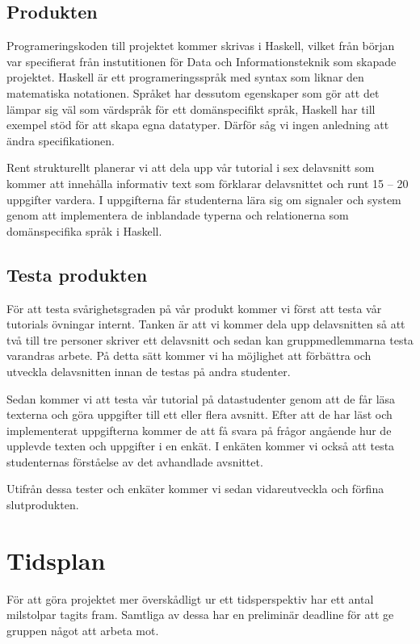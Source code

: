 \documentclass{article}
\begin{document}
\subsection{Produkten}
Programeringskoden till projektet kommer skrivas i Haskell,
vilket från början var specifierat från instutitionen för
Data och Informationsteknik som skapade projektet.
Haskell är ett programeringsspråk med syntax som liknar den
matematiska notationen. Språket har dessutom egenskaper
som gör att det lämpar sig väl som värdspråk för ett domänspecifikt språk,
Haskell har till exempel stöd för att skapa egna datatyper.
Därför såg vi ingen anledning att ändra specifikationen.

Rent strukturellt planerar vi att dela upp vår tutorial i
sex delavsnitt som kommer att innehålla informativ text som
förklarar delavsnittet och runt 15 -- 20 uppgifter vardera.
I uppgifterna får studenterna lära sig om signaler och
system genom att implementera de inblandade typerna
och relationerna som domänspecifika språk i Haskell.

\subsection{Testa produkten}
För att testa svårighetsgraden på vår produkt kommer vi
först att testa vår tutorials övningar internt. Tanken är att
vi kommer dela upp delavsnitten så att två till tre personer
skriver ett delavsnitt och sedan kan gruppmedlemmarna testa
varandras arbete. På detta sätt kommer vi ha möjlighet att
förbättra och utveckla delavsnitten innan de
testas på andra studenter.

Sedan kommer vi att testa vår tutorial på datastudenter genom
att de får läsa texterna och göra uppgifter till ett eller flera avsnitt.
Efter att de har läst och implementerat uppgifterna kommer de att få svara på
frågor angående hur de upplevde texten och uppgifter i en enkät.
I enkäten kommer vi också att testa studenternas förståelse av det avhandlade avsnittet.

Utifrån dessa tester och enkäter kommer vi sedan vidareutveckla och förfina slutprodukten.

\section{Tidsplan}
För att göra projektet mer överskådligt ur ett
tidsperspektiv har ett antal milstolpar tagits fram.
Samtliga av dessa har en preliminär deadline för
att ge gruppen något att arbeta mot.
\end{document}
